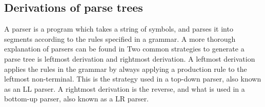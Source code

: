 \subsection{Derivations of parse trees}\label{sec:parsetrees}
A parser is a program which takes a string of symbols, and parses it into segments according to the rules specified in a grammar.
A more thorough explanation of parsers can be found in 
Two common strategies to generate a parse tree is leftmost derivation and rightmost derivation. 
A leftmost derivation applies the rules in the grammar by always applying a production rule to the leftmost non-terminal. 
This is the strategy used in a top-down parser, also known as an LL parser.
A rightmost derivation is the reverse, and what is used in a bottom-up parser, also known as a LR parser. 

%

